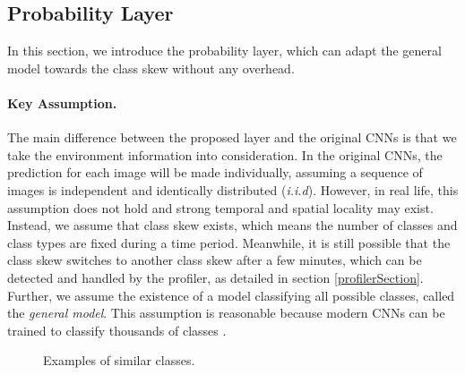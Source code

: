 \documentclass[pageno]{jpaper}
\begin{document}
\subsection{Probability Layer}
In this section, we introduce the probability layer, which can adapt the general model towards the class skew without any overhead.

\paragraph{Key Assumption.} 
The main difference between the proposed layer and the original CNNs is that we take the environment information into consideration. In the original CNNs, the prediction for each image will be made individually, assuming a sequence of images is independent and identically distributed (\textit{i.i.d}). However, in real life, this assumption does not hold and strong temporal and spatial locality may exist. Instead, we assume that class skew exists, which means the number of classes and class types are fixed during a time period. Meanwhile, it is still possible that the class skew switches to another class skew after a few minutes, which can be detected and handled by the profiler, as detailed in section \ref{profilerSection}. Further, we assume the existence of a model classifying all possible classes, called the \textit{general model}. This assumption is reasonable because modern CNNs can be trained to classify thousands of classes \cite{krizhevsky2012imagenet, simonyan2014very, szegedy2015going, he2016deep, huang2017densely}.



   \begin{figure}
     \hfill
     \caption{Examples of similar classes.}
     \label{fig:exampleSimilar}
   \end{figure}
\end{document}
